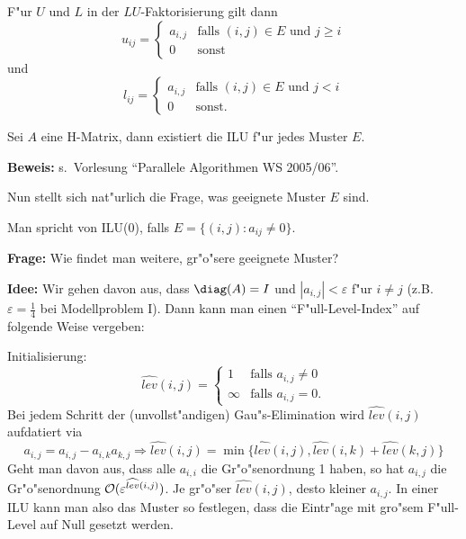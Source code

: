 F"ur $U$ und $L$ in der $LU$-Faktorisierung gilt dann
$$ u_{ij} =
\begin{cases}
  a_{i,j}  & \text{falls } (i,j) \in E \text{ und } j \geq i \\
  0 & \text{sonst}
\end{cases}
$$
und 
$$ l_{ij} =
\begin{cases}
  a_{i,j}  & \text{falls } (i,j) \in E \text{ und } j < i \\
  0 & \text{sonst}.
\end{cases}
$$

\begin{sa}
Sei $A$ eine H-Matrix, dann existiert die ILU f"ur jedes Muster $E$.
\end{sa}

{\bf Beweis:} s.\ Vorlesung "`Parallele Algorithmen WS 2005/06"'.

Nun stellt sich nat"urlich die Frage, was geeignete Muster $E$ sind.

\begin{defn}
Man spricht von ILU(0), falls $ E = \{ (i,j) : a_{ij} \neq 0 \} $.
\end{defn}

{\bf Frage:} Wie findet man weitere, gr"o"sere geeignete Muster?

\medskip

{\bf Idee:} Wir gehen davon aus, dass $ \diag(A) = I $ und $|a_{i,j}| < \varepsilon$
f"ur  $i \neq j$ (z.B. $\varepsilon = \frac 14$ bei Modellproblem I). Dann kann man einen "`F"ull-Level-Index"' auf
folgende Weise vergeben:

\medskip

Initialisierung:
$$
\widehat{lev}(i,j) =
\begin{cases}
   1 & \text{falls } a_{i,j} \neq 0 \\
   \infty & \text{falls } a_{i,j} = 0.
\end{cases}
$$
Bei jedem Schritt der (unvollst"andigen) Gau"s-Elimination wird $\widehat{lev}(i,j)$ 
aufdatiert via
\begin{equation}\label{aufdatierunglevel}
a_{i,j} = a_{i,j} - a_{i,k} a_{k,j} \Rightarrow \widehat{lev}(i,j) = \min \{ \widehat{lev}(i,j),\widehat{lev}(i,k) + \widehat{lev}(k,j) \}
\end{equation}
Geht man davon aus, dass alle $a_{i,i}$ die Gr"o"senordnung 1 haben, so hat
$a_{i,j}$ die Gr"o"senordnung ${\cal O}(\varepsilon^{\widehat{lev}(i,j)})$.
Je gr"o"ser $\widehat{lev}(i,j)$, desto kleiner $a_{i,j}$. In einer ILU
kann man also das Muster so festlegen, dass die Eintr"age mit gro"sem F"ull-Level
auf Null gesetzt werden.

